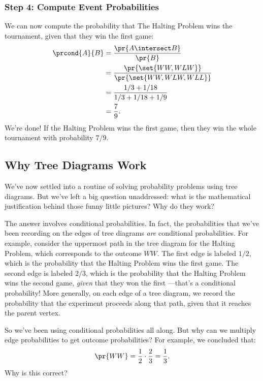 \subsubsection*{Step 4: Compute Event Probabilities}

We can now compute the probability that The Halting Problem wins the
tournament, given that they win the first game:
%
\begingroup
{}
\begin{align*}
\prcond{A}{B}
    & = \frac{\pr{A \intersect B}}{\pr{B}} \\
    & = \frac{\pr{\set{WW, WLW}}}{\pr{\set{WW, WLW, WLL}}} \\
    & = \frac{1/3 + 1/18}{1/3 + 1/18 + 1/9} \\
    & = \frac{7}{9}.
\end{align*}
\endgroup
%
We're done!  If the Halting Problem wins the first game, then they win
the whole tournament with probability $7 / 9$.


\subsection{Why Tree Diagrams Work}\label{product_rule_subsec}

We've now settled into a routine of solving probability problems using
tree diagrams.  But we've left a big question unaddressed: what is the
mathematical justification behind those funny little pictures?  Why do
they work?

The answer involves conditional probabilities.  In fact, the
probabilities that we've been recording on the edges of tree diagrams
\emph{are} conditional probabilities.  For example, consider the
uppermost path in the tree diagram for the Halting Problem, which
corresponds to the outcome $WW$.  The first edge is labeled $1/2$,
which is the probability that the Halting Problem wins the first game.
The second edge is labeled $2 / 3$, which is the probability that the
Halting Problem wins the second game, \emph{given} that they won the
first ---that's a conditional probability!  More generally, on each
edge of a tree diagram, we record the probability that the experiment
proceeds along that path, given that it reaches the parent vertex.

So we've been using conditional probabilities all along.  But why can
we multiply edge probabilities to get outcome probabilities?  For
example, we concluded that:
%
\begin{equation*}
\pr{WW} = \frac{1}{2} \cdot \frac{2}{3}
	= \frac{1}{3}.
\end{equation*}
%
Why is this correct?

